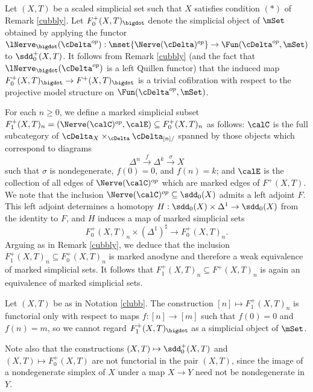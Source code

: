 \begin{notation}\label{clubb}
Let $(X,T)$ be a scaled simplicial set such that $X$ satisfies condition $(\ast)$ of Remark \ref{cubbly}. Let $F^{+}_0(X,T)_{\bigdot}$ denote the 
simplicial object of $\mSet$ obtained by applying the functor $\lNerve_{\bigdot}(\cDelta^{op} ):
\mset{ \Nerve(\cDelta)^{op} } \rightarrow \Fun( \cDelta^{op}, \mSet)$ to
$\sdd^{+}_0(X,T)$. It follows from Remark \ref{cubbly} (and the fact that $\lNerve_{\bigdot}(\cDelta^{op})$ is a left Quillen functor) that the induced map $F^{+}_0(X,T)_{\bigdot} \rightarrow F^{+}(X,T)_{\bigdot}$ is a trivial cofibration with respect to the projective model structure on $ \Fun( \cDelta^{op}, \mSet)$.

For each $n \geq 0$, we define a marked simplicial subset $F^{+}_1(X,T)_{n} =
( \Nerve(\calC)^{op}, \calE) \subseteq F^{+}_0(X,T)_n$ as follows:
$\calC$ is the full subcategory of $\cDelta_{X} \times_{\cDelta} \cDelta_{[n]/}$
spanned by those objects which correspond to diagrams
$$ \Delta^n \stackrel{f}{\rightarrow} \Delta^k \stackrel{\sigma}{\rightarrow} X$$
such that $\sigma$ is nondegenerate, $f(0) = 0$, and $f(n) = k$; and
$\calE$ is the collection of all edges of $\Nerve(\calC)^{op}$ which are marked edges
of $F^{+}(X,T)$. We note that the inclusion
$\Nerve(\calC)^{op} \subseteq \sdd_0(X)$ admits a left adjoint $F$.
This left adjoint determines a homotopy $H: \sdd_0(X) \times \Delta^1 \rightarrow \sdd_0(X)$ from
the identity to $F$, and $H$ induces a map of marked simplicial sets
$$ F^{+}_0(X,T)_n \times (\Delta^1)^{\sharp} \rightarrow F^{+}_0(X,T)_n.$$
Arguing as in Remark \ref{cubbly}, we deduce that the inclusion
$F^{+}_1(X,T)_n \subseteq F^{+}_0(X,T)_n$ is marked anodyne and therefore a weak equivalence of marked simplicial sets. It follows that $F^{+}_1(X,T)_n \subseteq F^{+}(X,T)_n$ is again an equivalence of marked simplicial sets.
\end{notation}

\begin{warning}
Let $(X,T)$ be as in Notation \ref{clubb}. The construction $[n] \mapsto F^{+}_{1}(X,T)_n$ is functorial only with respect to maps $f: [n] \rightarrow [m]$ such that $f(0) = 0$ and $f(n) = m$, so we cannot
regard $F^{+}_1(X,T)_{\bigdot}$ as a simplicial object of $\mSet$.

Note also that the constructions $(X,T) \mapsto \sdd^{+}_0(X,T)$ and $(X,T) \mapsto F^{+}_0(X,T)$
are not functorial in the pair $(X,T)$, since the image of a nondegenerate simplex of $X$
under a map $X \rightarrow Y$ need not be nondegenerate in $Y$.
\end{warning}

